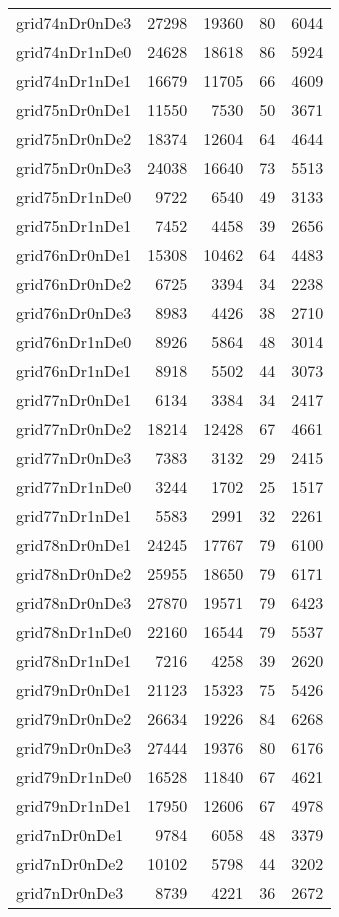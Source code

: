 \begin{longtable}{lrrrr}
grid74nDr0nDe3 & 27298 & 19360 & 80 & 6044 \\
grid74nDr1nDe0 & 24628 & 18618 & 86 & 5924 \\
grid74nDr1nDe1 & 16679 & 11705 & 66 & 4609 \\
grid75nDr0nDe1 & 11550 & 7530 & 50 & 3671 \\
grid75nDr0nDe2 & 18374 & 12604 & 64 & 4644 \\
grid75nDr0nDe3 & 24038 & 16640 & 73 & 5513 \\
grid75nDr1nDe0 & 9722 & 6540 & 49 & 3133 \\
grid75nDr1nDe1 & 7452 & 4458 & 39 & 2656 \\
grid76nDr0nDe1 & 15308 & 10462 & 64 & 4483 \\
grid76nDr0nDe2 & 6725 & 3394 & 34 & 2238 \\
grid76nDr0nDe3 & 8983 & 4426 & 38 & 2710 \\
grid76nDr1nDe0 & 8926 & 5864 & 48 & 3014 \\
grid76nDr1nDe1 & 8918 & 5502 & 44 & 3073 \\
grid77nDr0nDe1 & 6134 & 3384 & 34 & 2417 \\
grid77nDr0nDe2 & 18214 & 12428 & 67 & 4661 \\
grid77nDr0nDe3 & 7383 & 3132 & 29 & 2415 \\
grid77nDr1nDe0 & 3244 & 1702 & 25 & 1517 \\
grid77nDr1nDe1 & 5583 & 2991 & 32 & 2261 \\
grid78nDr0nDe1 & 24245 & 17767 & 79 & 6100 \\
grid78nDr0nDe2 & 25955 & 18650 & 79 & 6171 \\
grid78nDr0nDe3 & 27870 & 19571 & 79 & 6423 \\
grid78nDr1nDe0 & 22160 & 16544 & 79 & 5537 \\
grid78nDr1nDe1 & 7216 & 4258 & 39 & 2620 \\
grid79nDr0nDe1 & 21123 & 15323 & 75 & 5426 \\
grid79nDr0nDe2 & 26634 & 19226 & 84 & 6268 \\
grid79nDr0nDe3 & 27444 & 19376 & 80 & 6176 \\
grid79nDr1nDe0 & 16528 & 11840 & 67 & 4621 \\
grid79nDr1nDe1 & 17950 & 12606 & 67 & 4978 \\
grid7nDr0nDe1 & 9784 & 6058 & 48 & 3379 \\
grid7nDr0nDe2 & 10102 & 5798 & 44 & 3202 \\
grid7nDr0nDe3 & 8739 & 4221 & 36 & 2672 \\

\end{longtable}
